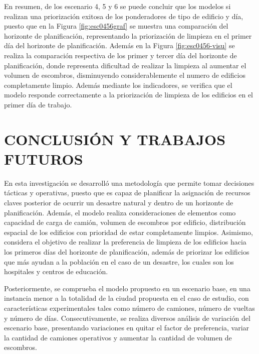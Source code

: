 \documentclass[letterpaper,conference]{IEEEtran}
\begin{document}
\pagebreak

En resumen, de los escenario 4, 5 y 6 se puede concluir que los  modelos si realizan una priorización exitosa de los ponderadores de tipo de edificio y día, puesto que en la Figura \ref{fig:esc0456graf} se muestra una comparación del horizonte de planificación, representando la priorización de limpieza en el primer día del horizonte de planificación. Además en la Figura \ref{fig:esc0456-visu} se realiza la comparación respectiva de los primer y tercer día del horizonte de planificación, donde representa dificultad de realizar la limpieza al aumentar el volumen de escombros, disminuyendo considerablemente el numero de edificios completamente limpio. Además mediante los indicadores, se verifica que el modelo responde correctamente a la priorización de limpieza de los edificios en el primer día de trabajo.




\section{CONCLUSIÓN Y TRABAJOS FUTUROS}

En esta investigación se desarrolló una metodología que permite tomar decisiones tácticas y operativas, puesto que es capaz de planificar la asignación de recursos claves posterior de ocurrir un desastre natural y dentro de un horizonte de planificación. Además, el modelo realiza consideraciones de elementos como capacidad de carga de camión, volumen de escombros por edificio, distribución espacial de los edificios con prioridad de estar completamente limpios.  Asimismo, considera el objetivo de realizar la preferencia de limpieza de los edificios hacia los primeros días del horizonte de planificación, además de priorizar los edificios que más ayudan a la población en el caso de un desastre, los cuales son los hospitales y centros de educación.

Posteriormente, se comprueba el modelo propuesto en un escenario base, en una instancia menor a la totalidad de la ciudad propuesta en el caso de estudio, con características experimentales tales como número de camiones, número de vueltas y número de días. Consecutivamente, se realiza diversos análisis de variación del escenario base, presentando variaciones en quitar el factor de preferencia, variar la cantidad de camiones operativos y aumentar la cantidad de volumen de escombros. 
\end{document}
